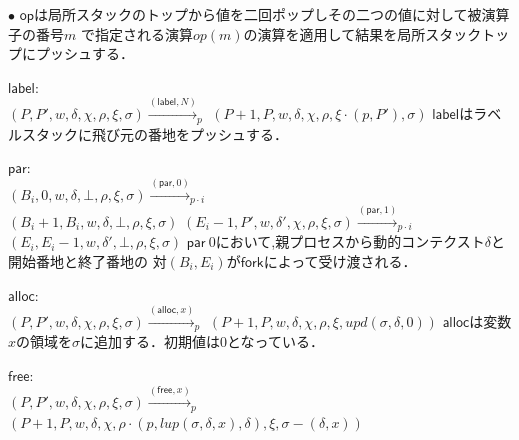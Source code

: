 \documentclass[submit,PRO]{ipsj}
\newcommand{\bcode}[1]{$\mathsf{#1}$}
\begin{document}
\begin{list}{$\bullet$}{}
\bcode{op}は局所スタックのトップから値を二回ポップしその二つの値に対して被演算子の番号$m$
で指定される演算$op(m)$の演算を適用して結果を局所スタックトップにプッシュする．
\item \bcode{label}:\\
$(P,P',w,\delta,\chi,\rho,\xi,\sigma)\xrightarrow{(\mathsf{label},N)}_p$\newline
\qquad$(P+1,P,w,\delta,\chi,\rho,\xi\cdot(p,P'),\sigma)$\newline
\bcode{label}はラベルスタックに飛び元の番地をプッシュする．
\item \bcode{par}:\\
$(B_i,0,w,\delta,\bot,\rho,\xi,\sigma)\xrightarrow{(\mathsf{par},0)}_{p\cdot i}$\\
\hspace*{.25\linewidth} $(B_i+1,B_i,w,\delta,\bot,\rho,\xi,\sigma)$\newline
$(E_i-1,P',w,\delta',\chi,\rho,\xi,\sigma)\xrightarrow{(\mathsf{par},1)}_{p\cdot i}$\\
\hspace*{.25\linewidth} $(E_i,E_i-1,w,\delta',\bot,\rho,\xi,\sigma)$\newline
$\mathsf{par}\ 0$において,親プロセスから動的コンテクスト$\delta$と開始番地と終了番地の
対$(B_i,E_i)$が\bcode{fork}によって受け渡される．
\item \bcode{alloc}:\\
$(P,P',w,\delta,\chi,\rho,\xi,\sigma)\xrightarrow{(\mathsf{alloc},x)}_p$\newline
\qquad $(P+1,P,w,\delta,\chi,\rho,\xi,upd(\sigma,\delta,0))$\newline
\bcode{alloc}は変数$x$の領域を$\sigma$に追加する．初期値は0となっている．
\item \bcode{free}:\\
$(P,P',w,\delta,\chi,\rho,\xi,\sigma)\xrightarrow{(\mathsf{free},x)}_p$\newline
\qquad $(P+1,P,w,\delta,\chi,\rho\cdot(p,lup(\sigma,\delta,x),\delta),\xi,\sigma-(\delta,x))$\newline

\end{list}
\end{document}
